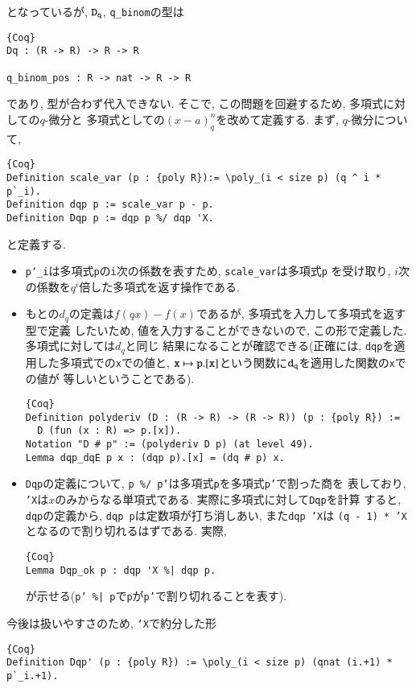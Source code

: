 \documentclass[11pt]{jarticle}
\theoremstyle{mystyle}
\newcommand{\0}{\textbf{0}}
\newcommand{\1}{\textbf{1}}
\newcommand{\2}{\textbf{2}}
\begin{document}
となっているが, ${\tt D}_{\tt q}$, {\tt q\_binom}の型は
\begin{lstlisting}{Coq}
Dq : (R -> R) -> R -> R

q_binom_pos : R -> nat -> R -> R \end{lstlisting}
であり, 型が合わず代入できない. そこで, この問題を回避するため, 多項式に対しての$q$-微分と
多項式としての$(x - a)^n_q$を改めて定義する. まず, $q$-微分について, 
\begin{lstlisting}{Coq}
Definition scale_var (p : {poly R}):= \poly_(i < size p) (q ^ i * p`_i).
Definition dqp p := scale_var p - p.
Definition Dqp p := dqp p %/ dqp 'X.
\end{lstlisting}
と定義する. 
\begin{itemize}
  \item {\tt p`\_i}は多項式{\tt p}の{\tt i}次の係数を表すため, {\tt scale\_var}は多項式{\tt p}
    を受け取り, $i$次の係数を$q^i$倍した多項式を返す操作である.
  \item もとの$d_q$の定義は$f(qx) - f(x)$であるが, 多項式を入力して多項式を返す型で定義
    したいため, 値を入力することができないので, この形で定義した. 多項式に対しては$d_q$と同じ
    結果になることが確認できる(正確には, {\tt dqp}を適用した多項式での{\tt x}での値と, 
    ${\tt x} \mapsto {\tt p.[x]}$という関数に${\tt d}_{\tt q}$を適用した関数の{\tt x}での値が
    等しいということである). 
    \begin{lstlisting}{Coq}
Definition polyderiv (D : (R -> R) -> (R -> R)) (p : {poly R}) :=
  D (fun (x : R) => p.[x]).
Notation "D # p" := (polyderiv D p) (at level 49).
Lemma dqp_dqE p x : (dqp p).[x] = (dq # p) x.
    \end{lstlisting}
  \item {\tt Dqp}の定義について, {\tt p \%/ p'}は多項式{\tt p}を多項式{\tt p'}で割った商を
    表しており, {\tt 'X}は$x$のみからなる単項式である. 実際に多項式に対して{\tt Dqp}を計算
    すると, {\tt dqp}の定義から, {\tt dqp p}は定数項が打ち消しあい, また{\tt dqp 'X}は
    {\tt (q - 1) * 'X}となるので割り切れるはずである. 実際, 
    \begin{lstlisting}{Coq}
Lemma Dqp_ok p : dqp 'X %| dqp p.
    \end{lstlisting}
    が示せる({\tt p' \%| p}で{\tt p}が{\tt p'}で割り切れることを表す). 
\end{itemize}
今後は扱いやすさのため, {\tt `X}で約分した形
\begin{lstlisting}{Coq}
Definition Dqp' (p : {poly R}) := \poly_(i < size p) (qnat (i.+1) * p`_i.+1).
\end{lstlisting}
\end{document}
